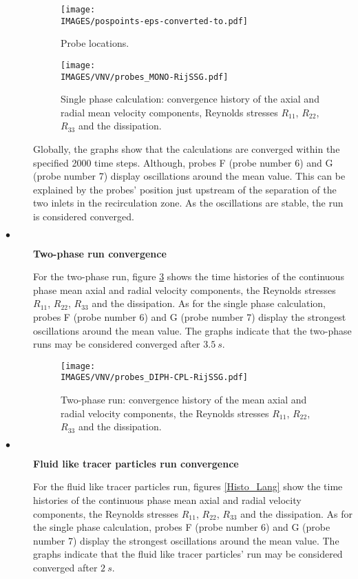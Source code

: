 \begin{description}
         \begin{figure}[H]
            \centerline{\texttt{[image: \\IMAGES/pospoints-eps-converted-to.pdf]}}
            \caption{Probe locations.}
            \label{pospoints}
         \end{figure}

         \begin{figure}[H]
            \centerline{\texttt{[image: \\IMAGES/VNV/probes\_MONO-RijSSG.pdf]}}
            \caption{Single phase calculation: convergence history of the axial and radial mean velocity components, Reynolds stresses $R_{11}$, $R_{22}$, $R_{33}$ and the dissipation.}
            \label{Histo_mono}
         \end{figure}

         Globally, the graphs show that the calculations are converged within the specified 2000 time steps. Although, probes F (probe number 6) and G (probe number 7) display oscillations around the mean value. This can be explained by the probes' position just upstream of the separation of the two inlets in the recirculation zone. As the oscillations are stable, the run is considered converged.

   \item[$\bullet$]\textbf{Two-phase run convergence}

         For the two-phase run, figure \ref{Histo_Cplt} shows the time histories of the continuous phase mean axial and radial velocity components, the Reynolds stresses $R_{11}$, $R_{22}$, $R_{33}$ and the
         dissipation. As for the single phase calculation, probes F (probe number 6) and G (probe number 7) display the strongest oscillations around the mean value.
         The graphs indicate that the two-phase runs may be considered converged after $3.5~s$.


         \begin{figure}[H]
            \centerline{\texttt{[image: \\IMAGES/VNV/probes\_DIPH-CPL-RijSSG.pdf]}}
            \caption{Two-phase run: convergence history of the mean axial and radial velocity components, the Reynolds stresses $R_{11}$, $R_{22}$, $R_{33}$ and the dissipation.}
            \label{Histo_Cplt}
         \end{figure}

   \item[$\bullet$]\textbf{Fluid like tracer particles run convergence}

         For the fluid like tracer particles run, figures \ref{Histo_Lang} show the time histories of the continuous phase mean axial and radial velocity components, the Reynolds stresses $R_{11}$, $R_{22}$, $R_{33}$ and the
         dissipation. As for the single phase calculation, probes F (probe number 6) and G (probe number 7) display the strongest oscillations around the mean value.
         The graphs indicate that the fluid like tracer particles' run may be considered converged after $2~s$.



\end{description}
